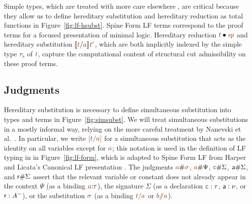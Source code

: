 Simple types, which are treated with more care elsewhere
\cite{harper07mechanizing,reed09hybrid}, are critical because they
allow us to define hereditary substitution and hereditary reduction as
total functions in Figure~\ref{fig:lf-hsubst}. Spine Form LF terms
correspond to the proof terms for a focused presentation of minimal
logic. Hereditary reduction $\subst{\lf{t}}{\lf{\spi}}$ and hereditary
substitution $\rsubst{\lf t}{\lf a}{\lf{t'}}$, which are both
implicitly indexed by the simple type $\tau_s$ of $\lf t$, capture the
computational content of structural cut admissibility on these proof
terms.

\subsection{Judgments}

Hereditary substitution is necessary to define simultaneous
substitution into types and terms in Figure~\ref{fig:simsubst}.  We
will treat simultaneous substitutions in a mostly informal way,
relying on the more careful treatment by Nanevski et
al.~\cite{nanevski08contextual}. In particular, we write $\lf{[t/a]}$
for a simultaneous substitution that acts as the identity on all
variables except for $\lf{a}$; this notation is used in the definition
of LF typing in in Figure~\ref{fig:lf-form}, which is adapted to Spine
Form LF from Harper and Licata's Canonical LF presentation
\cite{harper07mechanizing}. The judgments $\lf{a}\#\lf{\sigma}$,
$\lf{a}\#\Psi$, $\lf{\sf c}\#\Sigma$, ${\sf a}\#\Sigma$, and ${\sf
  r}\#\Sigma$ assert that the relevant variable or constant does not
already appear in the context $\Psi$ (as a binding $\lf{a}{:}\tau$),
the signature $\Sigma$ (as a declaration $\lf{\sf c} : \tau$, ${\sf a}
: \nu$, or ${\sf r} : A^-$), or the substitution $\lf{\sigma}$ (as a
binding $\lf{t/a}$ or \mbox{$\lf{b/\!\!/a}$}).

